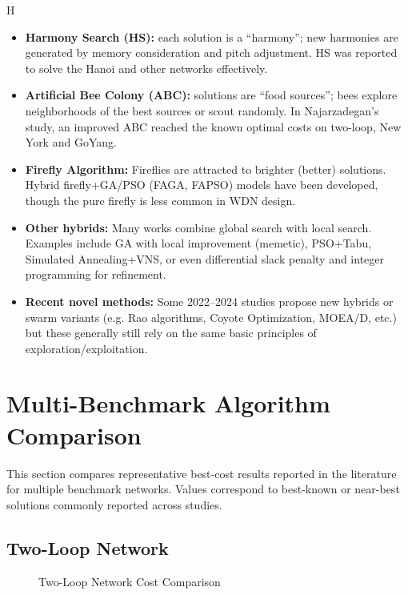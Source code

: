 H\documentclass[12pt, a4paper]{article}
\begin{document}
\begin{itemize}
    \item \textbf{Harmony Search (HS):} each solution is a ``harmony''; new harmonies are generated by memory consideration and pitch adjustment. HS was reported to solve the Hanoi and other networks effectively.
    \item \textbf{Artificial Bee Colony (ABC):} solutions are ``food sources''; bees explore neighborhoods of the best sources or scout randomly. In Najarzadegan's study, an improved ABC reached the known optimal costs on two-loop, New York and GoYang\cite{ref9}.
    \item \textbf{Firefly Algorithm:} Fireflies are attracted to brighter (better) solutions. Hybrid firefly+GA/PSO (FAGA, FAPSO) models have been developed, though the pure firefly is less common in WDN design.
    \item \textbf{Other hybrids:} Many works combine global search with local search. Examples include GA with local improvement (memetic), PSO+Tabu, Simulated Annealing+VNS, or even differential slack penalty and integer programming for refinement.
    \item \textbf{Recent novel methods:} Some 2022--2024 studies propose new hybrids or swarm variants (e.g. Rao algorithms, Coyote Optimization, MOEA/D, etc.) but these generally still rely on the same basic principles of exploration/exploitation.
\end{itemize}



\section{Multi-Benchmark Algorithm Comparison}

This section compares representative best-cost results reported in the 
literature for multiple benchmark networks. Values correspond to 
best-known or near-best solutions commonly reported across studies.


\subsection{Two-Loop Network}

\begin{figure}[H]
\centering
{}
\caption{Two-Loop Network Cost Comparison}
\end{figure}
\end{document}
